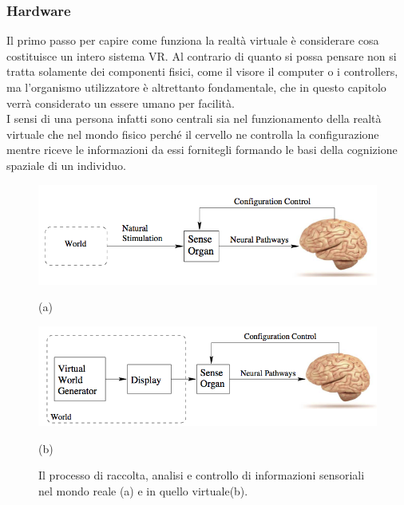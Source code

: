 \subsubsection{Hardware}

Il primo passo per capire come funziona la realtà virtuale è considerare cosa costituisce un intero sistema VR.
Al contrario di quanto si possa pensare non si tratta solamente dei componenti fisici, come il visore il computer o i controllers, ma l'organismo utilizzatore è altrettanto fondamentale, che in questo capitolo verrà considerato un essere umano per facilità.\\
I sensi di una persona infatti sono centrali sia nel funzionamento della realtà virtuale che nel mondo fisico perché il cervello ne controlla la configurazione mentre riceve le informazioni da essi fornitegli formando le basi della cognizione spaziale di un individuo.\\
\begin{figure}[h]
	\centering
	\begin{minipage}[b]{0.4\textwidth}
		\includegraphics[width=\textwidth]{figure/RealityBB}
		{\footnotesize \centerline{(a)} \par}
	\end{minipage}
	\hfill
	\begin{minipage}[b]{0.4\textwidth}
		\includegraphics[width=\textwidth]{figure/VRBB}
			{\footnotesize \centerline{(b)} \par}
	\end{minipage}
	\caption{Il processo di raccolta, analisi e controllo di informazioni sensoriali nel mondo reale (a) e in quello virtuale(b).}
\end{figure}



